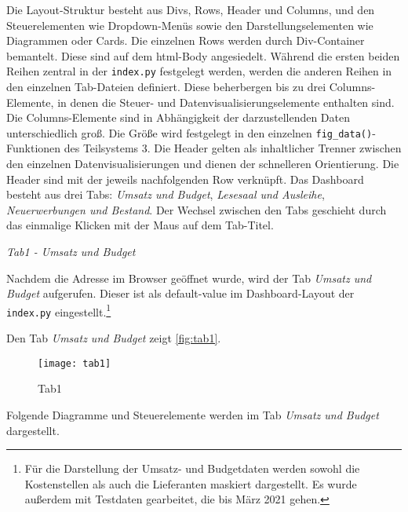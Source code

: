     Die Layout-Struktur besteht aus Divs, Rows, Header und Columns, und den Steuerelementen wie Dropdown-Menüs sowie den Darstellungselementen wie Diagrammen oder
    Cards. Die einzelnen Rows werden durch Div-Container bemantelt. Diese sind auf dem html-Body angesiedelt.
    Während die ersten beiden Reihen zentral in der \texttt{index.py} festgelegt werden, werden die anderen Reihen in den einzelnen Tab-Dateien definiert. 
    Diese beherbergen bis zu drei Columns-Elemente, in denen die Steuer- und Datenvisualisierungselemente enthalten sind.
    Die Columns-Elemente sind in Abhängigkeit der darzustellenden Daten unterschiedlich groß. 
    Die Größe wird festgelegt in den einzelnen \texttt{fig\_data()}-Funktionen des Teilsystems 3.
    Die Header gelten als inhaltlicher Trenner zwischen den einzelnen Datenvisualisierungen und dienen der schnelleren Orientierung. 
    Die Header sind mit der jeweils nachfolgenden Row verknüpft. Das Dashboard besteht aus drei Tabs: \textit{Umsatz und Budget}, 
    \textit{Lesesaal und Ausleihe}, \textit{Neuerwerbungen und Bestand}. Der Wechsel zwischen den Tabs geschieht durch das einmalige
    Klicken mit der Maus auf dem Tab-Titel.

    \clearpage
    \noindent
    \textit{Tab1 - Umsatz und Budget}

    Nachdem die Adresse im Browser geöffnet wurde, wird der Tab \textit{Umsatz und Budget} aufgerufen. Dieser ist
    als default-value im Dashboard-Layout der \texttt{index.py} eingestellt.\footnote{Für die Darstellung der Umsatz- und
    Budgetdaten werden sowohl die Kostenstellen als auch die Lieferanten maskiert dargestellt. Es wurde außerdem mit Testdaten
    gearbeitet, die bis März 2021 gehen.}

    Den Tab \textit{Umsatz und Budget} zeigt \autoref{fig:tab1}.

    
    \begin{figure}[H]
        \centering
            \texttt{[image: tab1]}
            \caption{Tab1}
            \label{fig:tab1}
    \end{figure}

    \clearpage
    Folgende Diagramme und Steuerelemente werden im Tab \textit{Umsatz und Budget} dargestellt.


